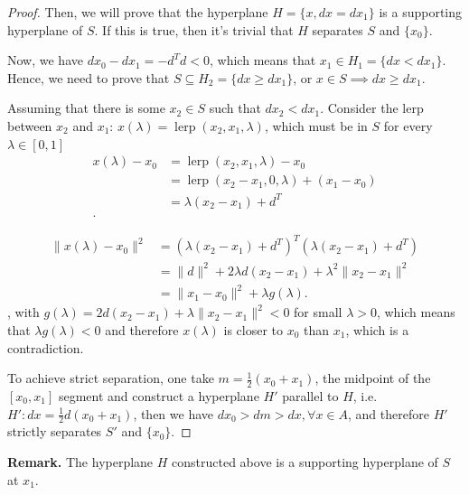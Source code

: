 \begin{proof}
  Then, we will prove that the hyperplane \( H = \{x, dx = dx_{1}\}   \) is a
  supporting hyperplane of \( S \). If this is true, then it's trivial that \( H
  \) separates \( S \) and \( \{x_{0}\}   \).

  Now, we have \( dx_{0}-dx_{1}=-d^{T}d < 0 \), which means that \( x_{1} \in
  H_{1} = \{dx < dx_{1}\}   \). Hence, we need to prove that \( S \subseteq
  H_{2} = \{dx \ge  dx_{1}\}   \), or \( x \in S \implies dx \ge  dx_{1} \).

  Assuming that there is some \( x_{2} \in S \) such that \( dx_{2} < dx_{1} \).
  Consider the lerp between \( x_{2} \) and \( x_{1} \): \( x(\lambda) =
  \operatorname{lerp}(x_{2}, x_{1}, \lambda) \), which must be in \( S \) for
  every \( \lambda \in [0, 1] \)
  \begin{align*}
    x(\lambda) - x_{0} &= \operatorname{lerp}(x_{2}, x_{1}, \lambda) -
    x_{0}\\
                       &= \operatorname{lerp}(x_{2}-x_{1}, 0, \lambda) + (x_{1}
                       - x_{0})\\
                       &= \lambda(x_{2}-x_{1}) + d^{T}\\
  .\end{align*}

  \begin{align*}
    \|x(\lambda)-x_{0}\|^2 &= (\lambda(x_{2}-x_{1}) + d^{T})^{T}(\lambda(x_{2}-x_{1})
    + d^{T})\\
                           &= \|d\|^2 + 2\lambda d(x_{2}-x_{1}) + \lambda
                           ^2\|x_{2}-x_{1}\|^2\\
                           &= \|x_{1}-x_{0}\|^2 + \lambda g(\lambda)
  .\end{align*},
  with \( g(\lambda) = 2d(x_{2}-x_{1}) + \lambda \|x_{2}-x_{1}\|^2 < 0 \) for
  small \( \lambda > 0 \), which means that \( \lambda g(\lambda) < 0 \) and
  therefore \( x(\lambda) \) is closer to \( x_{0} \) than \( x_{1} \), which is
  a contradiction.

  To achieve strict separation, one take \( m = \frac{1}{2}(x_{0} + x_{1}) \),
  the midpoint of the \( [x_{0}, x_{1}] \) segment and construct a hyperplane \(
  H' \) parallel to \( H \), i.e. \( H': dx = \frac{1}{2}d(x_{0} + x_{1}) \),
  then we have \( dx_{0} > dm > dx, \forall  x \in A \), and therefore \( H' \)
  strictly separates \( S' \) and \( \{ x_{0}\}   \).
\end{proof}

\textbf{Remark. } The hyperplane \( H \) constructed above is a supporting
  hyperplane of \( S \) at \( x_{1} \).

